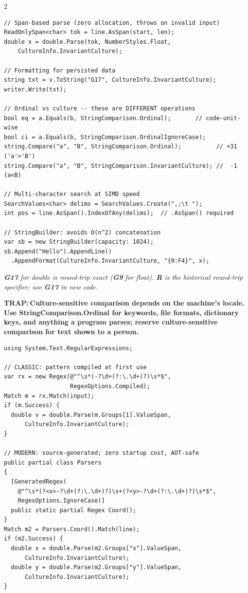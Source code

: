 \documentclass[9pt,a4paper]{extarticle}
\newenvironment{card}[3][acBlue]{%
  \begin{tcolorbox}[
    enhanced, colback=#2, colframe=bdCard,
    coltitle=black, colbacktitle=#2!70!bgHdr,
    fonttitle=\bfseries\fontsize{6.16pt}{7.48pt}\selectfont\MakeUppercase,
    title={#3},
    left=3pt, right=2pt, top=1.4pt, bottom=1.8pt,
    toptitle=1pt, bottomtitle=1pt,
    boxrule=0.4pt,
    borderline west={3pt}{0pt}{#1},
    arc=2pt, before skip=0pt, after skip=1.6mm,
    breakable, toprule at break=0pt, bottomrule at break=0pt,
  ]}{\end{tcolorbox}}
\newcommand{\code}[1]{{\ttfamily\bfseries #1}}
\newcommand{\trap}[1]{\par\noindent
  \begin{minipage}{\linewidth}%
  {\fontsize{5.6pt}{6.8pt}\selectfont\color{trap}\bfseries TRAP:\,#1}%
  \end{minipage}\par}
\newcommand{\note}[1]{\par\noindent
  \begin{minipage}{\linewidth}%
  {\fontsize{5.6pt}{6.8pt}\selectfont\itshape #1}%
  \end{minipage}\par}
\begin{document}
\begin{multicols}{2}
\begin{card}[acGreen]{bgGreen}{Strings \& Number Formatting}
\begin{lstlisting}[style=cs]
// Span-based parse (zero allocation, throws on invalid input)
ReadOnlySpan<char> tok = line.AsSpan(start, len);
double x = double.Parse(tok, NumberStyles.Float,
    CultureInfo.InvariantCulture);

// Formatting for persisted data
string txt = v.ToString("G17", CultureInfo.InvariantCulture);
writer.Write(txt);

// Ordinal vs culture -- these are DIFFERENT operations
bool eq = a.Equals(b, StringComparison.Ordinal);       // code-unit-wise
bool ci = a.Equals(b, StringComparison.OrdinalIgnoreCase);
string.Compare("a", "B", StringComparison.Ordinal);          // +31 ('a'>'B')
string.Compare("a", "B", StringComparison.InvariantCulture); //  -1 (a<B)

// Multi-character search at SIMD speed
SearchValues<char> delims = SearchValues.Create(",;\t ");
int pos = line.AsSpan().IndexOfAny(delims);  // .AsSpan() required

// StringBuilder: avoids O(n^2) concatenation
var sb = new StringBuilder(capacity: 1024);
sb.Append("Hello").AppendLine()
  .AppendFormat(CultureInfo.InvariantCulture, "{0:F4}", x);
\end{lstlisting}
\note{\code{G17} for double is round-trip exact (\code{G9} for float).
\code{R} is the historical round-trip specifier; use \code{G17}
in new code.}
\trap{Culture-sensitive comparison depends on the machine's locale. Use
\code{StringComparison.Ordinal} for keywords, file formats, dictionary keys,
and anything a program parses; reserve culture-sensitive comparison for text
shown to a person.}
\end{card}

\begin{card}[acPurple]{bgPurple}{Regex --- Source-Generated}
\begin{lstlisting}[style=cs]
using System.Text.RegularExpressions;

// CLASSIC: pattern compiled at first use
var rx = new Regex(@"^\s*(-?\d+(?:\.\d+)?)\s*$",
                   RegexOptions.Compiled);
Match m = rx.Match(input);
if (m.Success) {
  double v = double.Parse(m.Groups[1].ValueSpan,
      CultureInfo.InvariantCulture);
}

// MODERN: source-generated; zero startup cost, AOT-safe
public partial class Parsers
{
  [GeneratedRegex(
    @"^\s*(?<x>-?\d+(?:\.\d+)?)\s+(?<y>-?\d+(?:\.\d+)?)\s*$",
    RegexOptions.IgnoreCase)]
  public static partial Regex Coord();
}
Match m2 = Parsers.Coord().Match(line);
if (m2.Success) {
  double x = double.Parse(m2.Groups["x"].ValueSpan,
      CultureInfo.InvariantCulture);
  double y = double.Parse(m2.Groups["y"].ValueSpan,
      CultureInfo.InvariantCulture);
}


\end{lstlisting}
\end{card}
\end{multicols}
\end{document}
